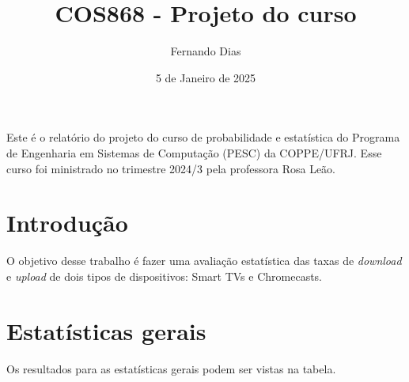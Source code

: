 \documentclass{article}
\title{COS868 - Projeto do curso}
\author{Fernando Dias}
\date{5 de Janeiro de 2025}
\begin{document}
\maketitle

Este é o relatório do projeto do curso de probabilidade e estatística do Programa de Engenharia em Sistemas de Computação (PESC) da COPPE/UFRJ. Esse curso foi ministrado no trimestre 2024/3 pela professora Rosa Leão.

\section{Introdução}

O objetivo desse trabalho é fazer uma avaliação estatística das taxas de \textit{download} e \textit{upload} de dois tipos de dispositivos: Smart TVs e Chromecasts. 

\section{Estatísticas gerais}

Os resultados para as estatísticas gerais podem ser vistas na tabela.


\end{document}
